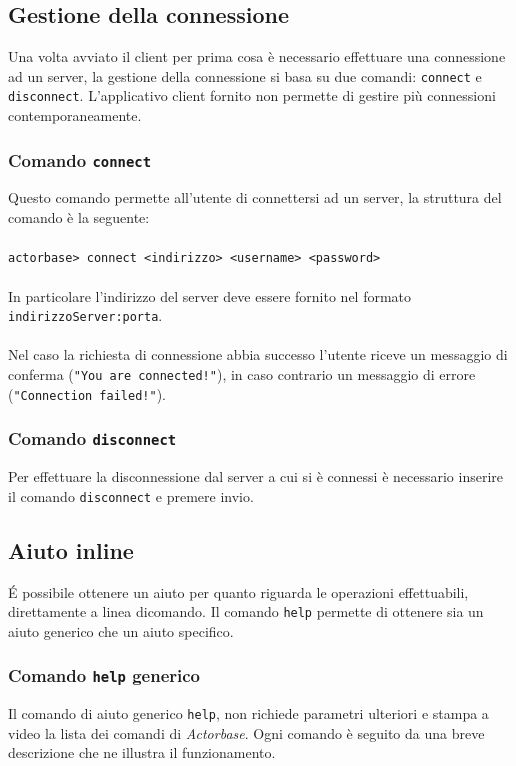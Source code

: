 \documentclass[a4paper]{article}
\begin{document}
	\subsection{Gestione della connessione}
	Una volta avviato il client per prima cosa è necessario effettuare una connessione ad un server, la gestione della connessione si basa su due comandi: \texttt{connect} e \texttt{disconnect}. L'applicativo client fornito non permette di gestire più connessioni contemporaneamente.
	
	\subsubsection{Comando \texttt{connect}}
	Questo comando permette all'utente di connettersi ad un server, la struttura del comando è la seguente:
	\\ \\
	\texttt{actorbase>	connect <indirizzo> <username> <password>}
	\\ \\
	In particolare l'indirizzo del server deve essere fornito nel formato \texttt{indirizzoServer:porta}. \\ \\
	Nel caso la richiesta di connessione abbia successo l'utente riceve un messaggio di conferma (\texttt{"You are connected!"}), in caso contrario un messaggio di errore (\texttt{"Connection failed!"}).
	
	\subsubsection{Comando \texttt{disconnect}}
	Per effettuare la disconnessione dal server a cui si è connessi è necessario inserire il comando \texttt{disconnect} e premere invio.
	

	\subsection{Aiuto inline}
	\'E possibile ottenere un aiuto per quanto riguarda le operazioni effettuabili, direttamente a linea dicomando. Il comando \texttt{help} permette di ottenere sia un aiuto generico che un aiuto specifico.
	
	\subsubsection{Comando \texttt{help} generico}
	Il comando di aiuto generico \texttt{help}, non richiede parametri ulteriori e stampa a video la lista dei comandi di \emph{Actorbase}. Ogni comando è seguito da una breve descrizione che ne illustra il funzionamento.
	
\end{document}
